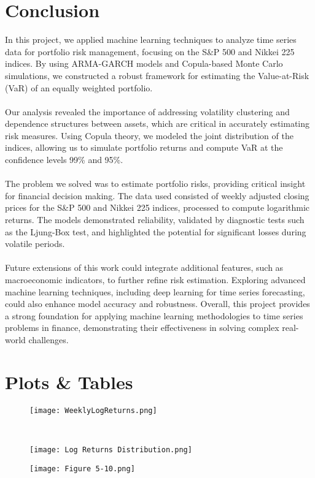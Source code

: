 \documentclass{article}
\begin{document}
\section{Conclusion}
In this project, we applied machine learning techniques to analyze time series data for portfolio risk management, focusing on the S\&P 500 and Nikkei 225 indices. By using ARMA-GARCH models and Copula-based Monte Carlo simulations, we constructed a robust framework for estimating the Value-at-Risk (VaR) of an equally weighted portfolio. \\
\\
Our analysis revealed the importance of addressing volatility clustering and dependence structures between assets, which are critical in accurately estimating risk measures. Using Copula theory, we modeled the joint distribution of the indices, allowing us to simulate portfolio returns and compute VaR at the confidence levels 99\% and 95\%. \\
\\
The problem we solved was to estimate portfolio risks, providing critical insight for financial decision making. The data used consisted of weekly adjusted closing prices for the S\&P 500 and Nikkei 225 indices, processed to compute logarithmic returns. The models demonstrated reliability, validated by diagnostic tests such as the Ljung-Box test, and highlighted the potential for significant losses during volatile periods. \\
\\
Future extensions of this work could integrate additional features, such as macroeconomic indicators, to further refine risk estimation. Exploring advanced machine learning techniques, including deep learning for time series forecasting, could also enhance model accuracy and robustness. Overall, this project provides a strong foundation for applying machine learning methodologies to time series problems in finance, demonstrating their effectiveness in solving complex real-world challenges.

\newpage
\section{Plots \& Tables}

\begin{figure}[htb]
    \centering
    \texttt{[image: WeeklyLogReturns.png]}
\end{figure} 
\\
\begin{figure}[htb]
    \centering
    \texttt{[image: Log Returns Distribution.png]}
\end{figure}
\begin{figure}[htb]
    \centering
    \texttt{[image: Figure 5-10.png]}
    \label{fig:enter-label}
\end{figure}
\end{document}
